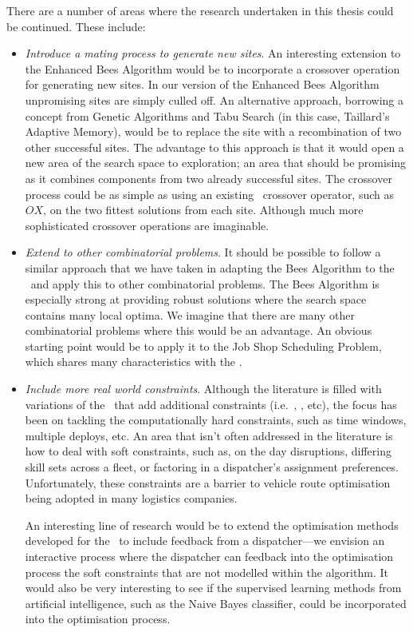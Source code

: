 There are a number of areas where the research undertaken in this thesis could be continued. These include:

\begin{itemize}

   \item \emph{Introduce a mating process to generate new sites}. An interesting extension to the Enhanced Bees Algorithm would be to incorporate a crossover operation for generating new sites. In our version of the Enhanced Bees Algorithm unpromising sites are simply culled off. An alternative approach, borrowing a concept from Genetic Algorithms and Tabu Search (in this case, Taillard's Adaptive Memory), would be to replace the site with a recombination of two other successful sites. The advantage to this approach is that it would open a new area of the search space to exploration; an area that should be promising as it combines components from two already successful sites. The crossover process could be as simple as using an existing \VRP\ crossover operator, such as $OX$, on the two fittest solutions from each site. Although much more sophisticated crossover operations are imaginable.

   \item \emph{Extend to other combinatorial problems}. It should be possible to follow a similar approach that we have taken in adapting the Bees Algorithm to the \VRP\ and apply this to other combinatorial problems. The Bees Algorithm is especially strong at providing robust solutions where the search space contains many local optima. We imagine that there are many other combinatorial problems where this would be an advantage. An obvious starting point would be to apply it to the Job Shop Scheduling Problem, which shares many characteristics with the \VRP.

   \item \emph{Include more real world constraints}. Although the literature is filled with variations of the \VRP\ that add additional constraints (i.e.~\VRPTW, \PDP, etc), the focus has been on tackling the computationally hard constraints, such as time windows, multiple deploys, etc. An area that isn't often addressed in the literature is how to deal with soft constraints, such as, on the day disruptions, differing skill sets across a fleet, or factoring in a dispatcher's assignment preferences. Unfortunately, these constraints are a barrier to vehicle route optimisation being adopted in many logistics companies. 
   
   An interesting line of research would be to extend the optimisation methods developed for the \VRP\ to include feedback from a dispatcher---we envision an interactive process where the dispatcher can feedback into the optimisation process the soft constraints that are not modelled within the algorithm. It would also be very interesting to see if the supervised learning methods from artificial intelligence, such as the Naive Bayes classifier, could be incorporated into the optimisation process.
      
\end{itemize}


